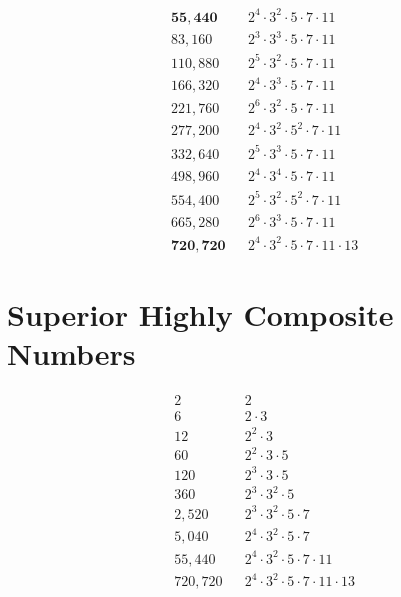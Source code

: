 \documentclass[12pt]{article}
\begin{document}
\begin{align*}
& \bm{55,440}  && 2^{4} \cdot 3^{2} \cdot 5 \cdot 7 \cdot 11\\
& 83,160	     && 2^{3} \cdot 3^{3} \cdot 5 \cdot 7 \cdot 11\\
& 110,880	     && 2^{5} \cdot 3^{2} \cdot 5 \cdot 7 \cdot 11\\
& 166,320	     && 2^{4} \cdot 3^{3} \cdot 5 \cdot 7 \cdot 11\\
& 221,760	     && 2^{6} \cdot 3^{2} \cdot 5 \cdot 7 \cdot 11\\
& 277,200	     && 2^{4} \cdot 3^{2} \cdot 5^{2} \cdot 7 \cdot 11\\
& 332,640	     && 2^{5} \cdot 3^{3} \cdot 5 \cdot 7 \cdot 11\\
& 498,960	     && 2^{4} \cdot 3^{4} \cdot 5 \cdot 7 \cdot 11\\
& 554,400	     && 2^{5} \cdot 3^{2} \cdot 5^{2} \cdot 7 \cdot 11\\
& 665,280	     && 2^{6} \cdot 3^{3} \cdot 5 \cdot 7 \cdot 11\\
& \bm{720,720} && 2^{4} \cdot 3^{2} \cdot 5 \cdot 7 \cdot 11 \cdot 13 
\end{align*}


\section*{Superior Highly Composite Numbers}
\begin{align*}
& 2       &&	2\\
& 6 	    && 2 \cdot 3\\
& 12 	    && 2^{2} \cdot 3\\
& 60 	    && 2^{2} \cdot 3 \cdot 5\\
& 120 	  && 2^{3} \cdot 3 \cdot 5\\
& 360 	  && 2^{3} \cdot 3^{2} \cdot 5\\
& 2,520 	&& 2^{3} \cdot 3^{2} \cdot 5 \cdot 7\\
& 5,040 	&& 2^{4} \cdot 3^{2} \cdot 5 \cdot 7\\
& 55,440  &&	2^{4} \cdot 3^{2} \cdot 5 \cdot 7 \cdot 11\\
& 720,720 &&	2^{4} \cdot 3^{2} \cdot 5 \cdot 7 \cdot 11 \cdot 13\\
\end{align*}
\end{document}
